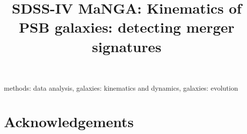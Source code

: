 \documentclass[11pt,fleqn,usenatbib]{mnras} %
\title[Kinematics of PSB galaxies]{SDSS-IV MaNGA: Kinematics of PSB galaxies: detecting merger signatures}
\begin{document}



\begingroup
\let\clearpage\relax
\tableofcontents
\listoftables
\listoffigures
\endgroup



\label{firstpage}
\pagerange{\pageref{firstpage}--\pageref{lastpage}}
\maketitle

\newpage

\begin{abstract}

\end{abstract}

\begin{keywords}
methods: data analysis, galaxies: kinematics and dynamics, galaxies: evolution
\end{keywords}




% 



% 













\section*{Acknowledgements}

\end{document}
